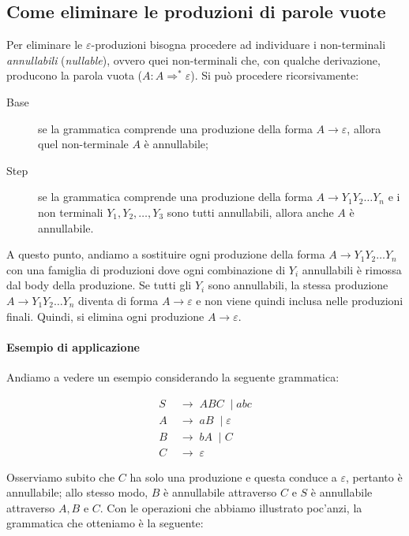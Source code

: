 \documentclass[class=book, crop=false, oneside, 12pt]{standalone}
\begin{document}
\subsection{Come eliminare le produzioni di parole vuote}
Per eliminare le \(\varepsilon\)-produzioni bisogna procedere ad individuare i non-terminali \emph{annullabili} (\emph{nullable}), ovvero quei non-terminali che, con qualche derivazione, producono la parola vuota (\(A : A \Rightarrow^\ast \varepsilon\)). Si può procedere ricorsivamente:
\begin{description}
  \item[Base] se la grammatica comprende una produzione della forma \(A \rightarrow \varepsilon\), allora quel non-terminale \(A\) è annullabile;
  \item[Step] se la grammatica comprende una produzione della forma \(A \rightarrow Y_1Y_2 \ldots Y_n\) e i non terminali \(Y_1, Y_2, \ldots, Y_3\) sono tutti annullabili, allora anche \(A\) è annullabile. 
\end{description}
A questo punto, andiamo a sostituire ogni produzione della forma \(A \rightarrow Y_1Y_2 \ldots Y_n\) con una famiglia di produzioni dove ogni combinazione di \(Y_i\) annullabili è rimossa dal body della produzione. Se tutti gli \(Y_i\) sono annullabili, la stessa produzione \(A \rightarrow Y_1Y_2 \ldots Y_n\) diventa di forma \(A \rightarrow \varepsilon\) e non viene quindi inclusa nelle produzioni finali. Quindi, si elimina ogni produzione \(A \rightarrow \varepsilon\).

\paragraph{Esempio di applicazione}
Andiamo a vedere un esempio considerando la seguente grammatica:
%

\begin{align*}
  S\; & \to\; ABC\; \mid abc \\
  A\; & \to\; aB\; \mid \varepsilon \\
  B\; & \to\; bA\; \mid C \\
  C\; & \to\; \varepsilon
\end{align*}

Osserviamo subito che \(C\) ha solo una produzione e questa conduce a \(\varepsilon\), pertanto è annullabile; allo stesso modo, \(B\) è annullabile attraverso \(C\) e \(S\) è annullabile attraverso \(A, B\) e \(C\). Con le operazioni che abbiamo illustrato poc'anzi, la grammatica che otteniamo è la seguente:
\end{document}
